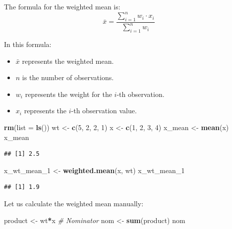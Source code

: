 \documentclass[
  doc]{apa6}
\newenvironment{Shaded}{\begin{snugshade}}{\end{snugshade}}
\newcommand{\AttributeTok}[1]{\textcolor[rgb]{0.13,0.29,0.53}{#1}}
\newcommand{\CommentTok}[1]{\textcolor[rgb]{0.56,0.35,0.01}{\textit{#1}}}
\newcommand{\DecValTok}[1]{\textcolor[rgb]{0.00,0.00,0.81}{#1}}
\newcommand{\FunctionTok}[1]{\textcolor[rgb]{0.13,0.29,0.53}{\textbf{#1}}}
\newcommand{\NormalTok}[1]{#1}
\newcommand{\OtherTok}[1]{\textcolor[rgb]{0.56,0.35,0.01}{#1}}
\newcommand{\SpecialCharTok}[1]{\textcolor[rgb]{0.81,0.36,0.00}{\textbf{#1}}}
\providecommand{\tightlist}{%
  \setlength{\itemsep}{0pt}\setlength{\parskip}{0pt}}
\begin{document}
The formula for the weighted mean is:
\[
\bar{x} = \frac{\sum_{i=1}^{n} w_i \cdot x_i}{\sum_{i=1}^{n} w_i}
\]

In this formula:

\begin{itemize}
\tightlist
\item
  \(\bar{x}\) represents the weighted mean.
\item
  \(n\) is the number of observations.
\item
  \(w_i\) represents the weight for the \(i\)-th observation.
\item
  \(x_i\) represents the \(i\)-th observation value.
\end{itemize}

\begin{Shaded}
\begin{Highlighting}[]
\FunctionTok{rm}\NormalTok{(}\AttributeTok{list =} \FunctionTok{ls}\NormalTok{())}
\NormalTok{wt }\OtherTok{\textless{}{-}} \FunctionTok{c}\NormalTok{(}\DecValTok{5}\NormalTok{, }\DecValTok{2}\NormalTok{, }\DecValTok{2}\NormalTok{, }\DecValTok{1}\NormalTok{)}
\NormalTok{x }\OtherTok{\textless{}{-}} \FunctionTok{c}\NormalTok{(}\DecValTok{1}\NormalTok{, }\DecValTok{2}\NormalTok{, }\DecValTok{3}\NormalTok{, }\DecValTok{4}\NormalTok{)}
\NormalTok{x\_mean }\OtherTok{\textless{}{-}} \FunctionTok{mean}\NormalTok{(x)}
\NormalTok{x\_mean}
\end{Highlighting}
\end{Shaded}

\begin{verbatim}
## [1] 2.5
\end{verbatim}

\begin{Shaded}
\begin{Highlighting}[]
\NormalTok{x\_wt\_mean\_1 }\OtherTok{\textless{}{-}} \FunctionTok{weighted.mean}\NormalTok{(x, wt)}
\NormalTok{x\_wt\_mean\_1}
\end{Highlighting}
\end{Shaded}

\begin{verbatim}
## [1] 1.9
\end{verbatim}

Let us calculate the weighted mean manually:

\begin{Shaded}
\begin{Highlighting}[]
\NormalTok{product }\OtherTok{\textless{}{-}}\NormalTok{ wt}\SpecialCharTok{*}\NormalTok{x}
\CommentTok{\# Nominator}
\NormalTok{nom }\OtherTok{\textless{}{-}} \FunctionTok{sum}\NormalTok{(product)}
\NormalTok{nom}
\end{Highlighting}
\end{Shaded}
\end{document}
